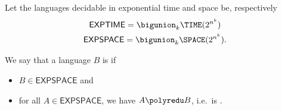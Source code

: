 \documentclass{standalone}
\begin{document}
  \begin{definition}
    Let the languages decidable in exponential time and space be, respectively
    \begin{gather*}
      \mathsf{EXPTIME} = \bigunion_k \TIME(2^{n^k}) \\
      \mathsf{EXPSPACE} = \bigunion_k \SPACE(2^{n^k}).
    \end{gather*}
  \end{definition}

  \begin{definition}
    We say that a language \(B\) is  if
    \begin{itemize}
      \item \(B \in \mathsf{EXPSPACE}\) and
      \item for all \(A \in \mathsf{EXPSPACE}\),
            we have \(A \polyredu B\),
            i.e.\ is .
	\end{itemize}
\end{definition}
\end{document}
